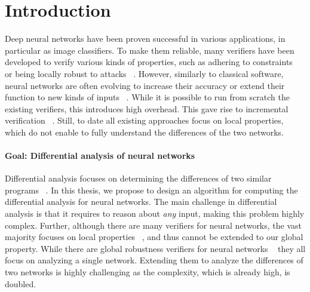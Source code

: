 
\section{Introduction}
Deep neural networks have been proven successful in various applications, in particular as image classifiers.
To make them reliable, many verifiers have been developed to verify various kinds of properties, such as adhering to constraints~\cite{Reluplex,COMPLETE,PLANET} or being locally robust to attacks ~\cite{Reluplex,ABSTRACTINTER,NEURIPS2021_fac7fead,COMPLETE}. However, similarly to classical software, neural networks are often evolving to increase their accuracy or extend their function to new kinds of inputs ~\cite{SURVEY_ROBUSTNESS,INTPROP}. While it is possible to run from scratch the existing verifiers, this introduces high overhead. This gave rise to incremental verification ~\cite{IVAN,INC_SEMIDEFINIT,INC_SMOOTH}. Still, to date all existing approaches focus on local properties, which do not enable to fully understand the differences of the two networks.

\paragraph{Goal: Differential analysis of neural networks}
Differential analysis focuses on determining the differences of two similar programs ~\cite{RELUDIFF,NEURODIFF,DIFFRNN,QEBVERIF,CFXROBUSTNESS}.
In this thesis, we propose to design an algorithm for computing the differential analysis for neural networks.
The main challenge in differential analysis is that it requires to reason about \emph{any} input, 
making this problem highly complex. Further, although there are many verifiers for neural networks, the vast majority focuses on local properties ~\cite{Reluplex,ABSTRACTINTER,NEURIPS2021_fac7fead,COMPLETE,CROWN}, and thus cannot be extended to our global property. While there are global robustness verifiers for neural networks ~\cite{Reluplex,ANOTHERGLOBALPROPERTY,MEASURENNROBCON,GLOBALPROPERTY} they all focus on analyzing a single network. Extending them to analyze the differences of two networks is highly challenging as the complexity, which is already high, is doubled.

